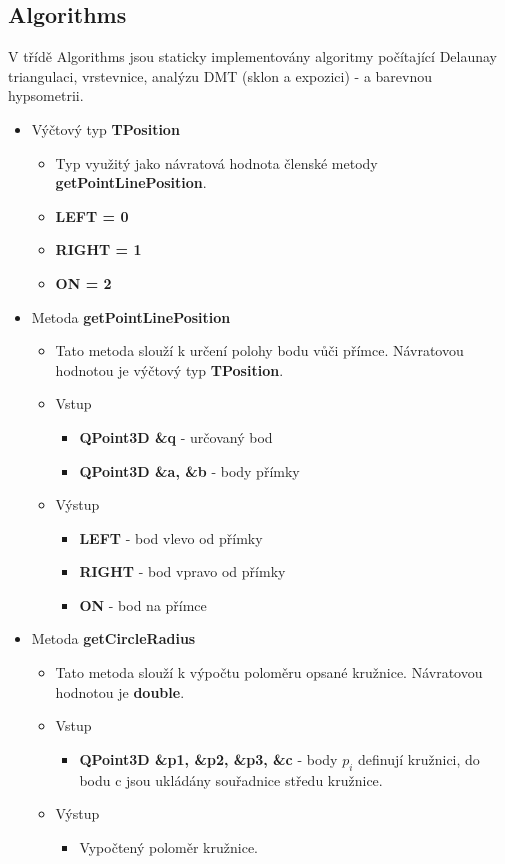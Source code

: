 \documentclass[a4paper, 12pt]{article}
\begin{document}
\subsection{Algorithms}
V třídě Algorithms jsou staticky implementovány algoritmy počítající Delaunay triangulaci, vrstevnice, analýzu DMT (sklon a expozici) - a barevnou hypsometrii. 

\begin{itemize}

	\item Výčtový typ \textbf{TPosition}
		\begin{itemize}
			\item Typ využitý jako návratová hodnota členské metody \textbf{getPointLinePosition}.
			\item \textbf{LEFT = 0}
			\item \textbf{RIGHT = 1}
			\item \textbf{ON = 2}
		\end{itemize}

	\item Metoda \textbf{getPointLinePosition}
		\begin{itemize}
			\item Tato metoda slouží k určení polohy bodu vůči přímce. Návratovou hodnotou je výčtový typ \textbf{TPosition}.
			\item Vstup
				\begin{itemize}
					\item \textbf{QPoint3D \&q} - určovaný bod
					\item \textbf{QPoint3D \&a, \&b} - body přímky
				\end{itemize}
			\item Výstup
				\begin{itemize}
					\item \textbf{LEFT} - bod vlevo od přímky
					\item \textbf{RIGHT} - bod vpravo od přímky
					\item \textbf{ON} - bod na přímce
				\end{itemize}

		\end{itemize}


	\item Metoda \textbf{getCircleRadius}
		\begin{itemize}
			\item Tato metoda slouží k výpočtu poloměru opsané kružnice. Návratovou hodnotou je \textbf{double}.
			\item Vstup
				\begin{itemize}
					\item \textbf{QPoint3D \&p1, \&p2, \&p3, \&c} - body $p_i$ definují kružnici, do bodu c jsou ukládány souřadnice středu kružnice.
				\end{itemize}
			\item Výstup
				\begin{itemize}	
					\item Vypočtený poloměr kružnice.
				\end{itemize}
		\end{itemize}	
		

\end{itemize}
\end{document}

